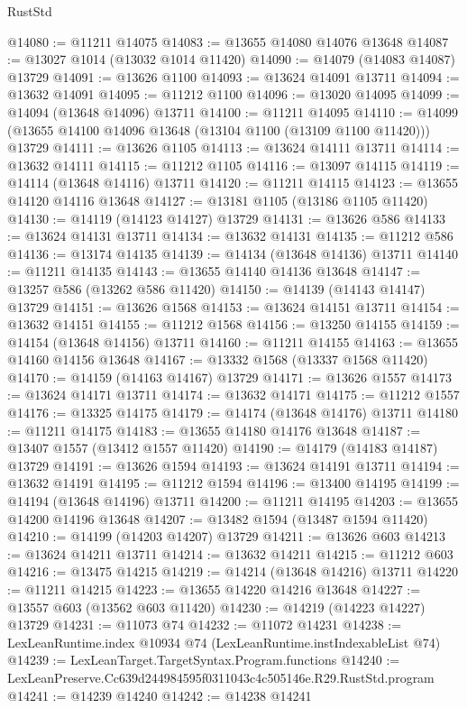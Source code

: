 \begin{lexlean}{RustStd}
\begin{coremodule}
@14080 := @11211 @14075
@14083 := @13655 @14080 @14076 @13648
@14087 := @13027 @1014 (@13032 @1014 @11420)
@14090 := @14079 (@14083 @14087) @13729
@14091 := @13626 @1100
@14093 := @13624 @14091 @13711
@14094 := @13632 @14091
@14095 := @11212 @1100
@14096 := @13020 @14095
@14099 := @14094 (@13648 @14096) @13711
@14100 := @11211 @14095
@14110 := @14099 (@13655 @14100 @14096 @13648 (@13104 @1100 (@13109 @1100 @11420))) @13729
@14111 := @13626 @1105
@14113 := @13624 @14111 @13711
@14114 := @13632 @14111
@14115 := @11212 @1105
@14116 := @13097 @14115
@14119 := @14114 (@13648 @14116) @13711
@14120 := @11211 @14115
@14123 := @13655 @14120 @14116 @13648
@14127 := @13181 @1105 (@13186 @1105 @11420)
@14130 := @14119 (@14123 @14127) @13729
@14131 := @13626 @586
@14133 := @13624 @14131 @13711
@14134 := @13632 @14131
@14135 := @11212 @586
@14136 := @13174 @14135
@14139 := @14134 (@13648 @14136) @13711
@14140 := @11211 @14135
@14143 := @13655 @14140 @14136 @13648
@14147 := @13257 @586 (@13262 @586 @11420)
@14150 := @14139 (@14143 @14147) @13729
@14151 := @13626 @1568
@14153 := @13624 @14151 @13711
@14154 := @13632 @14151
@14155 := @11212 @1568
@14156 := @13250 @14155
@14159 := @14154 (@13648 @14156) @13711
@14160 := @11211 @14155
@14163 := @13655 @14160 @14156 @13648
@14167 := @13332 @1568 (@13337 @1568 @11420)
@14170 := @14159 (@14163 @14167) @13729
@14171 := @13626 @1557
@14173 := @13624 @14171 @13711
@14174 := @13632 @14171
@14175 := @11212 @1557
@14176 := @13325 @14175
@14179 := @14174 (@13648 @14176) @13711
@14180 := @11211 @14175
@14183 := @13655 @14180 @14176 @13648
@14187 := @13407 @1557 (@13412 @1557 @11420)
@14190 := @14179 (@14183 @14187) @13729
@14191 := @13626 @1594
@14193 := @13624 @14191 @13711
@14194 := @13632 @14191
@14195 := @11212 @1594
@14196 := @13400 @14195
@14199 := @14194 (@13648 @14196) @13711
@14200 := @11211 @14195
@14203 := @13655 @14200 @14196 @13648
@14207 := @13482 @1594 (@13487 @1594 @11420)
@14210 := @14199 (@14203 @14207) @13729
@14211 := @13626 @603
@14213 := @13624 @14211 @13711
@14214 := @13632 @14211
@14215 := @11212 @603
@14216 := @13475 @14215
@14219 := @14214 (@13648 @14216) @13711
@14220 := @11211 @14215
@14223 := @13655 @14220 @14216 @13648
@14227 := @13557 @603 (@13562 @603 @11420)
@14230 := @14219 (@14223 @14227) @13729
@14231 := @11073 @74
@14232 := @11072 @14231
@14238 := LexLeanRuntime.index @10934 @74 (LexLeanRuntime.instIndexableList @74)
@14239 := LexLeanTarget.TargetSyntax.Program.functions
@14240 := LexLeanPreserve.Cc639d244984595f0311043c4c505146e.R29.RustStd.program
@14241 := @14239 @14240
@14242 := @14238 @14241

\end{coremodule}
\end{lexlean}

